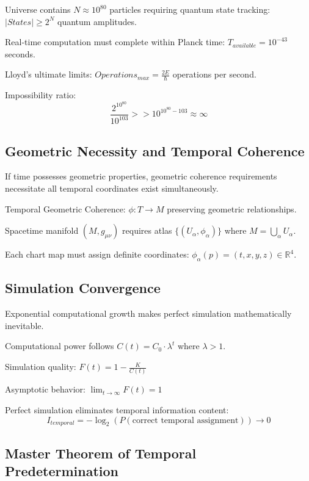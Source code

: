 \documentclass[12pt,a4paper]{article}
\begin{document}
Universe contains $N \approx 10^{80}$ particles requiring quantum state tracking: $|States| \geq 2^N$ quantum amplitudes.

Real-time computation must complete within Planck time: $T_{available} = 10^{-43}$ seconds.

Lloyd's ultimate limits: $Operations_{max} = \frac{2E}{\hbar}$ operations per second.

Impossibility ratio:
\begin{equation}
\frac{2^{10^{80}}}{10^{103}} >> 10^{10^{80}-103} \approx \infty
\end{equation}

\subsection{Geometric Necessity and Temporal Coherence}

If time possesses geometric properties, geometric coherence requirements necessitate all temporal coordinates exist simultaneously.

Temporal Geometric Coherence: $\phi: T \to M$ preserving geometric relationships.

Spacetime manifold $(M, g_{\mu\nu})$ requires atlas $\{(U_\alpha, \phi_\alpha)\}$ where $M = \bigcup_\alpha U_\alpha$.

Each chart map must assign definite coordinates: $\phi_\alpha(p) = (t, x, y, z) \in \mathbb{R}^4$.

\subsection{Simulation Convergence}

Exponential computational growth makes perfect simulation mathematically inevitable.

Computational power follows $C(t) = C_0 \cdot \lambda^t$ where $\lambda > 1$.

Simulation quality: $F(t) = 1 - \frac{K}{C(t)}$

Asymptotic behavior: $\lim_{t \to \infty} F(t) = 1$

Perfect simulation eliminates temporal information content:
\begin{equation}
I_{temporal} = -\log_2(P(\text{correct temporal assignment})) \to 0
\end{equation}

\subsection{Master Theorem of Temporal Predetermination}
\end{document}
